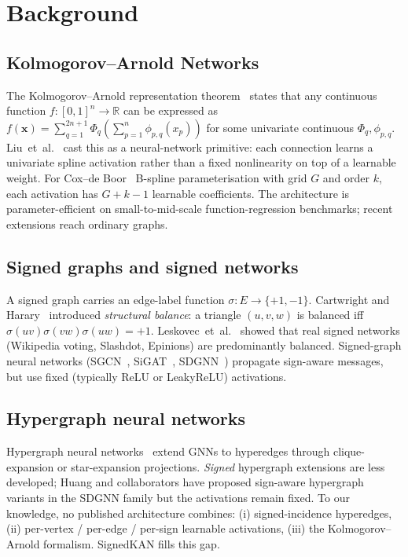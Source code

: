 \section{Background}
\label{sec:background}

\subsection{Kolmogorov--Arnold Networks}

The Kolmogorov--Arnold representation theorem~\cite{kolmogorov1957}
states that any continuous function $f : [0,1]^n \to \mathbb{R}$ can
be expressed as
$f(\mathbf{x}) = \sum_{q=1}^{2n+1} \Phi_q\!\left(\sum_{p=1}^{n} \phi_{p,q}(x_p)\right)$
for some univariate continuous $\Phi_q, \phi_{p,q}$.
Liu~et~al.~\cite{liu2024kan} cast this as a neural-network primitive:
each connection learns a univariate spline activation rather than a
fixed nonlinearity on top of a learnable weight. For Cox--de
Boor~\cite{coxdeboor} B-spline parameterisation with grid $G$ and
order $k$, each activation has $G + k - 1$ learnable coefficients.
The architecture is parameter-efficient on small-to-mid-scale
function-regression benchmarks; recent extensions reach ordinary
graphs.

\subsection{Signed graphs and signed networks}

A signed graph carries an edge-label function
$\sigma : E \to \{+1, -1\}$. Cartwright and
Harary~\cite{cartwright1956structural} introduced \emph{structural
balance}: a triangle $(u, v, w)$ is balanced iff
$\sigma(uv)\sigma(vw)\sigma(uw) = +1$.
Leskovec~et~al.~\cite{leskovec2010signed} showed that real signed
networks (Wikipedia voting, Slashdot, Epinions) are predominantly
balanced. Signed-graph neural networks
(SGCN~\cite{derr2018sgcn}, SiGAT~\cite{huang2019sigat},
SDGNN~\cite{huang2021sdgnn}) propagate sign-aware messages, but use
fixed (typically ReLU or LeakyReLU) activations.

\subsection{Hypergraph neural networks}

Hypergraph neural networks~\cite{feng2019hgnn,bai2021hgnn} extend
GNNs to hyperedges through clique-expansion or star-expansion
projections. \emph{Signed} hypergraph extensions are less developed;
Huang and collaborators have proposed sign-aware hypergraph variants
in the SDGNN family but the activations remain fixed. To our
knowledge, no published architecture combines:
(i) signed-incidence hyperedges,
(ii) per-vertex / per-edge / per-sign learnable activations,
(iii) the Kolmogorov--Arnold formalism.
SignedKAN fills this gap.

